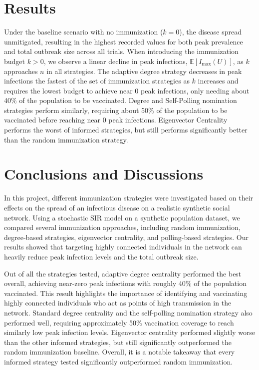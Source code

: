 \documentclass[9pt,twocolumn,twoside]{pnas-new}
\begin{document}
\section*{Results}
Under the baseline scenario with no immunization ($k=0$), the disease spread unmitigated, resulting in the highest recorded values for both peak prevalence and total outbreak size across all trials.
When introducing the immunization budget $k > 0$, we observe a linear decline in peak infections, $\mathbb{E}[I_{\max}(U)]$, as $k$ approaches $n$ in all strategies. The adaptive degree strategy decreases in peak infections the fastest of the set of immunization strategies as $k$ increases and requires the lowest budget to achieve near 0 peak infections, only needing about 40\% of the population to be vaccinated. Degree and Self-Polling nomination strategies perform similarly, requiring about 50\% of the population to be vaccinated before reaching near 0 peak infections. Eigenvector Centrality performs the worst of informed strategies, but still performs significantly better than the random immunization strategy. 

\section*{Conclusions and Discussions}

In this project, different immunization strategies were investigated based on their effects on the spread of an infectious disease on a realistic synthetic social network. Using a stochastic SIR model on a synthetic population dataset, we compared several immunization approaches, including random immunization, degree-based strategies, eigenvector centrality, and polling-based strategies. Our results showed that targeting highly connected individuals in the network can heavily reduce peak infection levels and the total outbreak size.

Out of all the strategies tested, adaptive degree centrality performed the best overall, achieving near-zero peak infections with roughly 40\% of the population vaccinated. This result highlights the importance of identifying and vaccinating highly connected individuals who act as points of high transmission in the network. Standard degree centrality and the self-polling nomination strategy also performed well, requiring approximately 50\% vaccination coverage to reach similarly low peak infection levels. Eigenvector centrality performed slightly worse than the other informed strategies, but still significantly outperformed the random immunization baseline. Overall, it is a notable takeaway that every informed strategy tested significantly outperformed random immunization.
\end{document}
